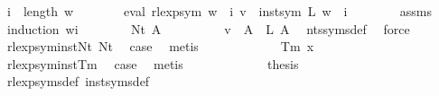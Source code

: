 \begin{isabellebody}
\ {\isachardoublequoteopen}i\ {\isacharless}{\kern0pt}\ length\ w{\isachardoublequoteclose}\isanewline
\ \ \ \ \isamarkupfalse%
\ \isamarkupfalse%
\ {\isachardoublequoteopen}eval\ {\isacharparenleft}{\kern0pt}rlexp{\isacharunderscore}{\kern0pt}sym\ {\isacharparenleft}{\kern0pt}w\ {\isacharbang}{\kern0pt}\ i{\isacharparenright}{\kern0pt}{\isacharparenright}{\kern0pt}\ v\ {\isacharequal}{\kern0pt}\ inst{\isacharunderscore}{\kern0pt}sym\ L\ {\isacharparenleft}{\kern0pt}w\ {\isacharbang}{\kern0pt}\ i{\isacharparenright}{\kern0pt}{\isachardoublequoteclose}\isanewline
\ \ \ \ \ \ \isamarkupfalse%
\ assms\ \isamarkupfalse%
\ {\isacharparenleft}{\kern0pt}induction\ {\isachardoublequoteopen}w{\isacharbang}{\kern0pt}i{\isachardoublequoteclose}{\isacharparenright}{\kern0pt}\isanewline
\ \ \ \ \ \ \isamarkupfalse%
\ {\isacharparenleft}{\kern0pt}Nt\ A{\isacharparenright}{\kern0pt}\isanewline
\ \ \ \ \ \ \isamarkupfalse%
\ \isamarkupfalse%
\ {\isachardoublequoteopen}v\ {\isacharparenleft}{\kern0pt}{\isasymgamma}{\isacharprime}{\kern0pt}\ A{\isacharparenright}{\kern0pt}\ {\isacharequal}{\kern0pt}\ L\ A{\isachardoublequoteclose}\ \isamarkupfalse%
\ nts{\isacharunderscore}{\kern0pt}syms{\isacharunderscore}{\kern0pt}def\ \isamarkupfalse%
\ force\isanewline
\ \ \ \ \ \ \isamarkupfalse%
\ rlexp{\isacharunderscore}{\kern0pt}sym{\isacharunderscore}{\kern0pt}inst{\isacharunderscore}{\kern0pt}Nt\ Nt\ \isamarkupfalse%
\ {\isacharquery}{\kern0pt}case\ \isamarkupfalse%
\ metis\isanewline
\ \ \ \ \isamarkupfalse%
\isanewline
\ \ \ \ \ \ \isamarkupfalse%
\ {\isacharparenleft}{\kern0pt}Tm\ x{\isacharparenright}{\kern0pt}\isanewline
\ \ \ \ \ \ \isamarkupfalse%
\ rlexp{\isacharunderscore}{\kern0pt}sym{\isacharunderscore}{\kern0pt}inst{\isacharunderscore}{\kern0pt}Tm\ \isamarkupfalse%
\ {\isacharquery}{\kern0pt}case\ \isamarkupfalse%
\ metis\isanewline
\ \ \ \ \isamarkupfalse%
\isanewline
\ \ \isamarkupfalse%
\isanewline
\ \ \isamarkupfalse%
\ \isamarkupfalse%
\ {\isacharquery}{\kern0pt}thesis\ \isamarkupfalse%
\ rlexp{\isacharunderscore}{\kern0pt}syms{\isacharunderscore}{\kern0pt}def\ inst{\isacharunderscore}{\kern0pt}syms{\isacharunderscore}{\kern0pt}def\ \isamarkupfalse%

\end{isabellebody}
